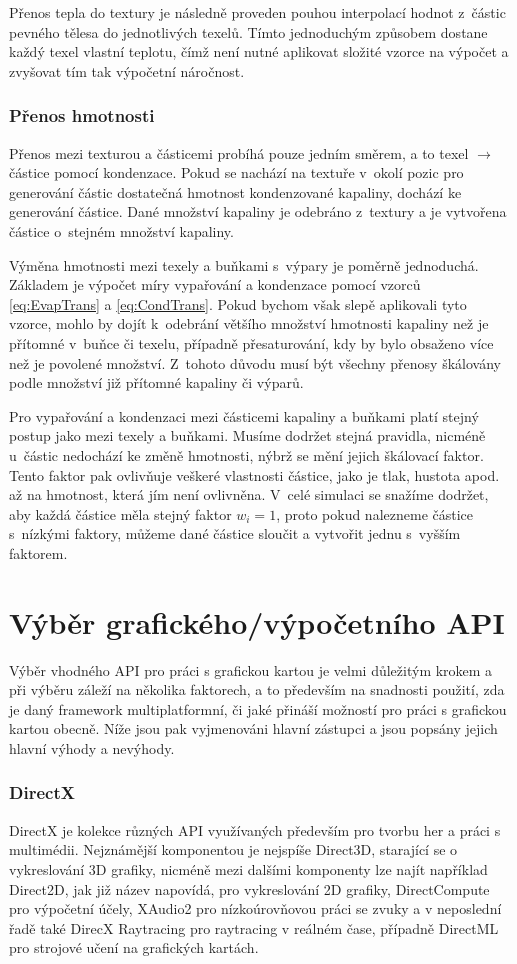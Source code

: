 Přenos tepla do textury je následně proveden pouhou interpolací hodnot z~částic pevného tělesa do jednotlivých texelů. Tímto jednoduchým způsobem dostane každý texel vlastní teplotu, čímž není nutné aplikovat složité vzorce na výpočet a zvyšovat tím tak výpočetní náročnost.

\subsubsection{Přenos hmotnosti}
Přenos mezi texturou a částicemi probíhá pouze jedním směrem, a to texel $\rightarrow$ částice pomocí kondenzace. Pokud se nachází na textuře v~okolí pozic pro generování částic dostatečná hmotnost kondenzované kapaliny, dochází ke generování částice. Dané množství kapaliny je odebráno z~textury a je vytvořena částice o~stejném množství kapaliny.

Výměna hmotnosti mezi texely a buňkami s~výpary je poměrně jednoduchá. Základem je výpočet míry vypařování a kondenzace pomocí vzorců \ref{eq:EvapTrans} a \ref{eq:CondTrans}. Pokud bychom však slepě aplikovali tyto vzorce, mohlo by dojít k~odebrání většího množství hmotnosti kapaliny než je přítomné v~buňce či texelu, případně přesaturování, kdy by bylo obsaženo více než je povolené množství. Z~tohoto důvodu musí být všechny přenosy škálovány podle množství již přítomné kapaliny či výparů.

Pro vypařování a kondenzaci mezi částicemi kapaliny a buňkami platí stejný postup jako mezi texely a buňkami. Musíme dodržet stejná pravidla, nicméně u~částic nedochází ke změně hmotnosti, nýbrž se mění jejich škálovací faktor. Tento faktor pak ovlivňuje veškeré vlastnosti částice, jako je tlak, hustota apod. až na hmotnost, která jím není ovlivněna. V~celé simulaci se snažíme dodržet, aby každá částice měla stejný faktor $w_i = 1$, proto pokud nalezneme částice s~nízkými faktory, můžeme dané částice sloučit a vytvořit jednu s~vyšším faktorem.

\section{Výběr grafického/výpočetního API}
Výběr vhodného API pro práci s grafickou kartou je velmi důležitým krokem a při výběru záleží na několika faktorech, a to především na snadnosti použití, zda je daný framework multiplatformní, či jaké přináší možností pro práci s grafickou kartou obecně. Níže jsou pak vyjmenováni hlavní zástupci a jsou popsány jejich hlavní výhody a nevýhody.
\subsubsection{DirectX}
DirectX je kolekce různých API využívaných především pro tvorbu her a práci s multimédii. Nejznámější komponentou je nejspíše Direct3D, starající se o vykreslování 3D grafiky, nicméně mezi dalšími komponenty lze najít například Direct2D, jak již název napovídá, pro vykreslování 2D grafiky, DirectCompute pro výpočetní účely, XAudio2 pro nízkoúrovňovou práci se zvuky a v neposlední řadě také DirecX Raytracing pro raytracing v reálném čase, případně DirectML pro strojové učení na grafických kartách.

